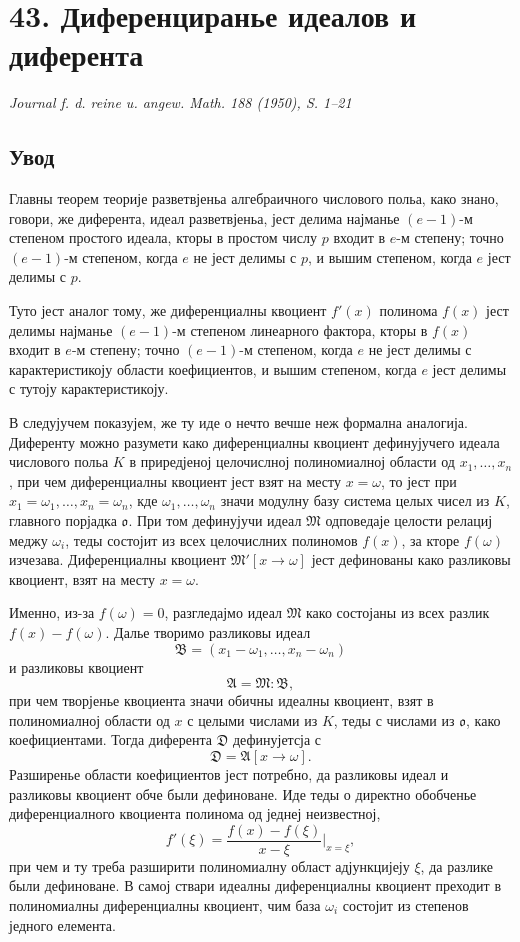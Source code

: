 ﻿\documentclass[11pt]{article}
\newcommand{\foreign}[1]{#1}
\begin{document}
\section*{43. Диференциранье идеалов и диферента}

\begin{center}
\emph{\foreign{Journal f. d. reine u. angew. Math. 188 (1950), S. 1--21}}
\end{center}

\subsection*{Увод}

Главны теорем теорије разветвјеньа алгебраичного числового польа, како знано, говори, же диферента, идеал разветвјеньа, јест делима најманье \((e-1)\)-м степеном простого идеала, кторы в простом числу \(p\) входит в \(e\)-м степену; точно \((e-1)\)-м степеном, когда \(e\) не јест делимы с \(p\), и вышим степеном, когда \(e\) јест делимы с \(p\).

Туто јест аналог тому, же диференциалны квоциент \(f'(x)\) полинома \(f(x)\) јест делимы најманье \((e-1)\)-м степеном линеарного фактора, кторы в \(f(x)\) входит в \(e\)-м степену; точно \((e-1)\)-м степеном, когда \(e\) не јест делимы с карактеристикоју области коефициентов, и вышим степеном, когда \(e\) јест делимы с тутоју карактеристикоју.

В следујучем показујем, же ту иде о нечто вечше неж формална аналогија. Диференту можно разумети како диференциалны квоциент дефинујучего идеала числового польа \(K\) в приредјеној целочислној полиномиалној области од \(x_1,\ldots,x_n\), при чем диференциалны квоциент јест взят на месту \(x=\omega\), то јест при \(x_1=\omega_1,\ldots,x_n=\omega_n\), кде \(\omega_1,\ldots,\omega_n\) значи модулну базу система целых чисел из \(K\), главного порјадка \(\mathfrak o\). При том дефинујучи идеал \(\mathfrak M\) одповедаје целости релациј меджу \(\omega_i\), теды состојит из всех целочислних полиномов \(f(x)\), за кторе \(f(\omega)\) изчезава. Диференциалны квоциент \(\mathfrak M'[x\to\omega]\) јест дефинованы како разликовы квоциент, взят на месту \(x=\omega\).

Именно, из-за \(f(\omega)=0\), разгледајмо идеал \(\mathfrak M\) како состојаны из всех разлик \(f(x)-f(\omega)\). Далье творимо разликовы идеал
\[
        \mathfrak B=(x_1-\omega_1,\ldots,x_n-\omega_n)
\]
и разликовы квоциент
\[
        \mathfrak A=\mathfrak M:\mathfrak B,
\]
при чем творјенье квоциента значи обичны идеалны квоциент, взят в полиномиалној области од \(x\) с целыми числами из \(K\), теды с числами из \(\mathfrak o\), како коефициентами. Тогда диферента \(\mathfrak D\) дефинујетсја с
\[
        \mathfrak D=\mathfrak A[x\to\omega].
\]
Разширенье области коефициентов јест потребно, да разликовы идеал и разликовы квоциент обче были дефиноване. Иде теды о директно обобченье диференциалного квоциента полинома од једнеј неизвестној,
\[
        f'(\xi)=\frac{f(x)-f(\xi)}{x-\xi}\bigg|_{x=\xi},
\]
при чем и ту треба разширити полиномиалну област адјункцијеју \(\xi\), да разлике были дефиноване. В самој ствари идеалны диференциалны квоциент преходит в полиномиалны диференциалны квоциент, чим база \(\omega_i\) состојит из степенов једного елемента.
\end{document}
